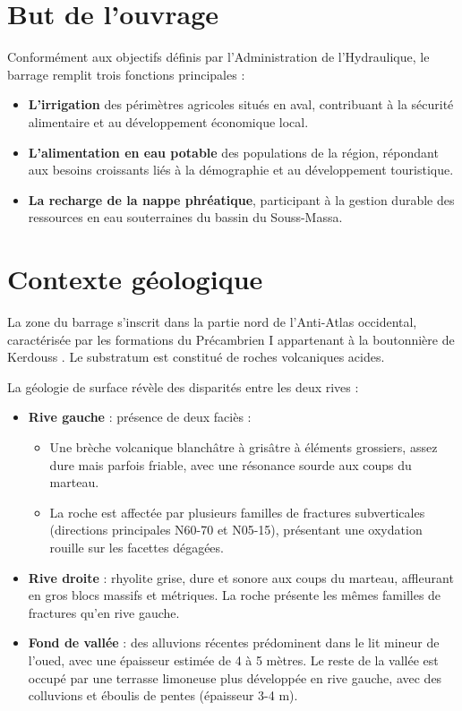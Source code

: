 \section{But de l'ouvrage}
\label{sec:but_ouvrage}

Conformément aux objectifs définis par l'Administration de l'Hydraulique, le barrage remplit trois fonctions principales \cite{scet1994ahl, fiche_synoptique} :
\begin{itemize}
    \item \textbf{L'irrigation} des périmètres agricoles situés en aval, contribuant à la sécurité alimentaire et au développement économique local.
    \item \textbf{L'alimentation en eau potable} des populations de la région, répondant aux besoins croissants liés à la démographie et au développement touristique.
    \item \textbf{La recharge de la nappe phréatique}, participant à la gestion durable des ressources en eau souterraines du bassin du Souss-Massa.
\end{itemize}

\section{Contexte géologique}
\label{sec:geologie}

La zone du barrage s'inscrit dans la partie nord de l'Anti-Atlas occidental, caractérisée par les formations du Précambrien I appartenant à la boutonnière de Kerdouss \cite{note_geologique_2003}. Le substratum est constitué de roches volcaniques acides.

La géologie de surface révèle des disparités entre les deux rives \cite{note_geologique_2003, fiche_synoptique} :
\begin{itemize}
    \item \textbf{Rive gauche} : présence de deux faciès :
    \begin{itemize}
        \item Une brèche volcanique blanchâtre à grisâtre à éléments grossiers, assez dure mais parfois friable, avec une résonance sourde aux coups du marteau.
        \item La roche est affectée par plusieurs familles de fractures subverticales (directions principales N60-70 et N05-15), présentant une oxydation rouille sur les facettes dégagées.
    \end{itemize}
    \item \textbf{Rive droite} : rhyolite grise, dure et sonore aux coups du marteau, affleurant en gros blocs massifs et métriques. La roche présente les mêmes familles de fractures qu'en rive gauche.
    \item \textbf{Fond de vallée} : des alluvions récentes prédominent dans le lit mineur de l'oued, avec une épaisseur estimée de 4 à 5 mètres. Le reste de la vallée est occupé par une terrasse limoneuse plus développée en rive gauche, avec des colluvions et éboulis de pentes (épaisseur 3-4 m).
\end{itemize}

